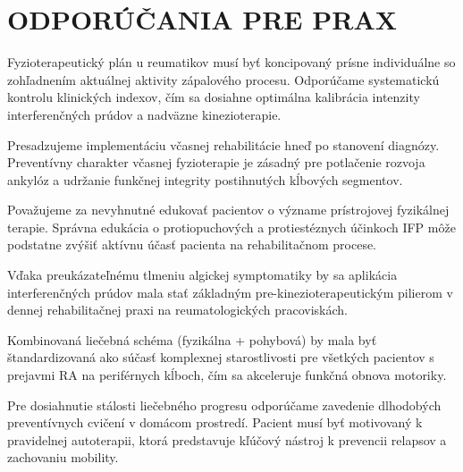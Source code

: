 \chapter{ODPORÚČANIA PRE PRAX}

Fyzioterapeutický plán u reumatikov musí byť koncipovaný prísne individuálne so zohľadnením aktuálnej aktivity zápalového procesu. Odporúčame systematickú kontrolu klinických indexov, čím sa dosiahne optimálna kalibrácia intenzity interferenčných prúdov a nadväzne kinezioterapie.

Presadzujeme implementáciu včasnej rehabilitácie hneď po stanovení diagnózy. Preventívny charakter včasnej fyzioterapie je zásadný pre potlačenie rozvoja ankylóz a udržanie funkčnej integrity postihnutých kĺbových segmentov.

Považujeme za nevyhnutné edukovať pacientov o význame prístrojovej fyzikálnej terapie. Správna edukácia o protiopuchových a protiestéznych účinkoch IFP môže podstatne zvýšiť aktívnu účasť pacienta na rehabilitačnom procese.

Vďaka preukázateľnému tlmeniu algickej symptomatiky by sa aplikácia interferenčných prúdov mala stať základným pre-kinezioterapeutickým pilierom v dennej rehabilitačnej praxi na reumatologických pracoviskách.

Kombinovaná liečebná schéma (fyzikálna + pohybová) by mala byť štandardizovaná ako súčasť komplexnej starostlivosti pre všetkých pacientov s prejavmi RA na periférnych kĺboch, čím sa akceleruje funkčná obnova motoriky.

Pre dosiahnutie stálosti liečebného progresu odporúčame zavedenie dlhodobých preventívnych cvičení v domácom prostredí. Pacient musí byť motivovaný k pravidelnej autoterapii, ktorá predstavuje kľúčový nástroj k prevencii relapsov a zachovaniu mobility.
